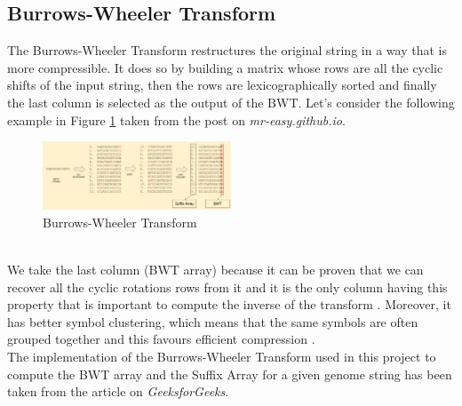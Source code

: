 \documentclass[final,5p,times,twocolumn,authoryear]{elsarticle}
\begin{document}
\subsection{Burrows-Wheeler Transform}
The Burrows-Wheeler Transform restructures the original string in a way that is more compressible. It does so by building a matrix whose rows are all the cyclic shifts of the input string, then the rows are lexicographically sorted and finally the last column is selected as the output of the BWT.
Let's consider the following example in Figure \ref{fig:bwt-label} taken from the post on \emph{mr-easy.github.io}\cite{mreasy}.
\begin{figure}
    \centering
    \includegraphics[width=0.5\textwidth]{images/bwt.png}
    \caption{Burrows-Wheeler Transform}
    \label{fig:bwt-label}
\end{figure}
\\ We take the last column (BWT array) because it can be proven that we can recover all the cyclic rotations rows from it and it is the only column having this property that is important to compute the inverse of the transform \cite{geeks}. Moreover, it has better symbol clustering, which means that the same symbols are often grouped together and this favours efficient compression \cite{geeks}. \\
The implementation\cite{bwt.h me} of the Burrows-Wheeler Transform used in this project to compute the BWT array and the Suffix Array for a given genome string has been taken from the article on \emph{GeeksforGeeks}\cite{geeks}.
\end{document}
